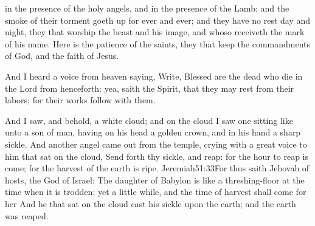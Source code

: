  in the presence of the holy angels, and in the presence of the Lamb: 
 and the smoke of their torment goeth up for ever and ever;%
 and they have no rest day and night,%
 they that worship the beast and his image, and whoso receiveth the mark of his name. 
 Here is the patience of the saints, they that keep the commandments of God, and the faith of Jesus.

 And I heard a voice from heaven saying, Write, Blessed are the dead who die in the Lord from henceforth: yea, saith the Spirit, that they may rest from their labors; for their works follow with them.

 And I saw, and behold, a white cloud; and on the cloud I saw one sitting like unto a son of man,%
 having on his head a golden crown, and in his hand a sharp sickle. 
 And another angel came out from the temple, crying with a great voice to him that sat on the cloud, Send forth thy sickle, and reap: for the hour to reap is come; for the harvest of the earth is ripe.%
				  {Jeremiah}{51:33}{For thus saith Jehovah of hosts, the God of Israel: The daughter of Babylon is like a threshing-floor at the time when it is trodden; yet a little while, and the time of harvest shall come for her}
 And he that sat on the cloud cast his sickle upon the earth; and the earth was reaped.

